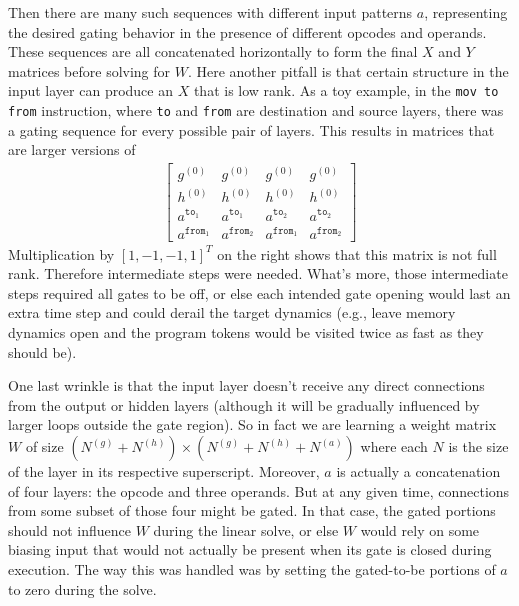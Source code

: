 \documentclass[pdftex,12pt,letterpaper]{article}
\begin{document}
Then there are many such sequences with different input patterns $a$, representing the desired gating behavior in the presence of different opcodes and operands.  These sequences are all concatenated horizontally to form the final $X$ and $Y$ matrices before solving for $W$.  Here another pitfall is that certain structure in the input layer can produce an $X$ that is low rank.  As a toy example, in the \texttt{mov to from} instruction, where \texttt{to} and \texttt{from} are destination and source layers, there was a gating sequence for every possible pair of layers.  This results in matrices that are larger versions of
\begin{align}
\left[\begin{array}{cccc}g^{(0)}&g^{(0)}&g^{(0)}&g^{(0)} \\ h^{(0)}&h^{(0)}&h^{(0)}&h^{(0)} \\ a^{\texttt{to}_1}&a^{\texttt{to}_1}&a^{\texttt{to}_2}&a^{\texttt{to}_2} \\ a^{\texttt{from}_1}&a^{\texttt{from}_2}&a^{\texttt{from}_1}&a^{\texttt{from}_2}\end{array}\right]
\end{align}
Multiplication by $[1, -1, -1, 1]^T$ on the right shows that this matrix is not full rank.  Therefore intermediate steps were needed.  What's more, those intermediate steps required all gates to be off, or else each intended gate opening would last an extra time step and could derail the target dynamics (e.g., leave memory dynamics open and the program tokens would be visited twice as fast as they should be).

One last wrinkle is that the input layer doesn't receive any direct connections from the output or hidden layers (although it will be gradually influenced by larger loops outside the gate region).  So in fact we are learning a weight matrix $W$ of size $(N^{(g)}+N^{(h)})\times(N^{(g)}+N^{(h)}+N^{(a)})$ where each $N$ is the size of the layer in its respective superscript.  Moreover, $a$ is actually a concatenation of four layers: the opcode and three operands.  But at any given time, connections from some subset of those four might be gated.  In that case, the gated portions should not influence $W$ during the linear solve, or else $W$ would rely on some biasing input that would not actually be present when its gate is closed during execution.  The way this was handled was by setting the gated-to-be portions of $a$ to zero during the solve.
\end{document}
